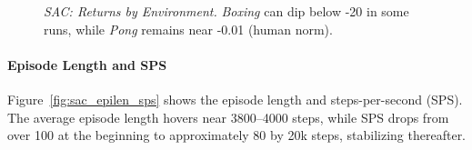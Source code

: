 \begin{figure}
	\centering
	\quad
	\caption{\emph{SAC: Returns by Environment.} \emph{Boxing} can dip below -20 in some runs, while \emph{Pong} remains near -0.01 (human norm).}
	\label{fig:sac_returns_pergame}
\end{figure}

\paragraph{Episode Length and SPS}
Figure~\ref{fig:sac_epilen_sps} shows the episode length and steps-per-second (SPS). The average episode length hovers near 3800–4000 steps, while SPS drops from over 100 at the beginning to approximately 80 by 20k steps, stabilizing thereafter.

